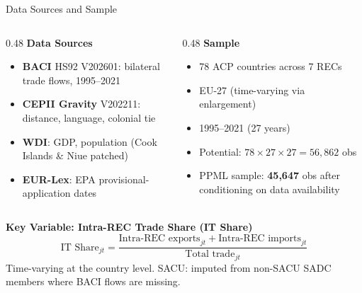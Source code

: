 \documentclass[aspectratio=169,11pt]{beamer}
\begin{document}
\begin{frame}{Data Sources and Sample}

    \begin{columns}[T]
        \begin{column}{0.48\textwidth}
            \textbf{Data Sources}
            \begin{itemize}
                \item \textbf{BACI} HS92 V202601: bilateral trade flows, 1995--2021
                \item \textbf{CEPII Gravity} V202211: distance, language, colonial tie
                \item \textbf{WDI}: GDP, population (Cook Islands \& Niue patched)
                \item \textbf{EUR-Lex}: EPA provisional-application dates
            \end{itemize}
        \end{column}
        \begin{column}{0.48\textwidth}
            \textbf{Sample}
            \begin{itemize}
                \item 78 ACP countries across 7 RECs
                \item EU-27 (time-varying via enlargement)
                \item 1995--2021 (27 years)
                \item Potential: $78 \times 27 \times 27 = 56{,}862$ obs
                \item PPML sample: \textbf{45,647} obs after conditioning on data availability
            \end{itemize}
        \end{column}
    \end{columns}

    \medskip

    \textbf{Key Variable: Intra-REC Trade Share (IT Share)}
    \[
        \text{IT Share}_{jt} = \frac{\text{Intra-REC exports}_{jt} +
        \text{Intra-REC imports}_{jt}}{\text{Total trade}_{jt}}
    \]
    Time-varying at the country level.
    SACU: imputed from non-SACU SADC members where BACI flows are missing.

\end{frame}
\end{document}
